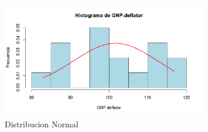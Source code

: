 \documentclass{article}
\begin{document}
    \begin{figure}[h] %
        \centering %
        \includegraphics[width=0.8\textwidth]{Normal.png}
        \caption{Distribucion Normal} %
        \label{fig:mi_imagen} %
    \end{figure}
\end{document}
